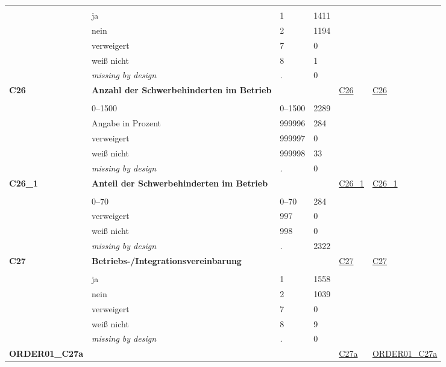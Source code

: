 \begin{longtable}{| L{2.45cm} | L{6cm} | C{1.5cm} | R{1cm} | C{2.25cm} | C{2.25cm} |}
   &  &  &  &  &  \\ 
   & ja & 1 & 1411 &  &  \\ 
   & nein & 2 & 1194 &  &  \\ 
   & verweigert & 7 & 0 &  &  \\ 
   & weiß nicht & 8 & 1 &  &  \\ 
   & \textit{missing by design} & \textit{.} & 0 &  &  \\ 
   \midrule
\textbf{C26}\label{var:C26} & \textbf{Anzahl der Schwerbehinderten im Betrieb} &  &  & \hyperref[C26]{C26} & \hyperref[var:suf:C26]{C26} \\ 
   &  &  &  &  &  \\ 
   & 0--1500 & 0--1500 & 2289 &  &  \\ 
   & Angabe in Prozent & 999996 & 284 &  &  \\ 
   & verweigert & 999997 & 0 &  &  \\ 
   & weiß nicht & 999998 & 33 &  &  \\ 
   & \textit{missing by design} & \textit{.} & 0 &  &  \\ 
   \midrule
\textbf{C26\_1}\label{var:C26:1} & \textbf{Anteil der Schwerbehinderten im Betrieb} &  &  & \hyperref[C26:1]{C26\_1} & \hyperref[var:suf:C26:1]{C26\_1} \\ 
   &  &  &  &  &  \\ 
   & 0--70 & 0--70 & 284 &  &  \\ 
   & verweigert & 997 & 0 &  &  \\ 
   & weiß nicht & 998 & 0 &  &  \\ 
   & \textit{missing by design} & \textit{.} & 2322 &  &  \\ 
   \midrule
\textbf{C27}\label{var:C27} & \textbf{Betriebs-/Integrationsvereinbarung} &  &  & \hyperref[C27]{C27} & \hyperref[var:suf:C27]{C27} \\ 
   &  &  &  &  &  \\ 
   & ja & 1 & 1558 &  &  \\ 
   & nein & 2 & 1039 &  &  \\ 
   & verweigert & 7 & 0 &  &  \\ 
   & weiß nicht & 8 & 9 &  &  \\ 
   & \textit{missing by design} & \textit{.} & 0 &  &  \\ 
   \midrule
\textbf{ORDER01\_C27a}\label{var:ORDER01:C27a} & \textbf{} &  &  & \hyperref[C27a]{C27a} & \hyperref[var:suf:ORDER01:C27a]{ORDER01\_C27a} \\ 

\end{longtable}
